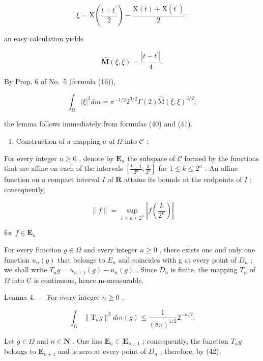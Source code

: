 \[
\xi = \mathrm{X} \left(\frac {t + t ^ {\prime}}{2}\right) - \frac {\mathrm{X} (t) + \mathrm{X} (t ^ {\prime})}{2};\tag{39}
\]

an easy calculation yields

\[
\widehat {\mathbf {M}} (\xi , \xi) = \frac {| t - t ^ {\prime} |}{4}.\tag{40}
\]

By Prop. 6 of No.~5 (formula (16)),

\[
\int_ {\Omega} | \xi | ^ {3} d m = \pi^ {- 1 / 2} 2 ^ {3 / 2} \Gamma (2) \widehat {\mathrm{M}} (\xi , \xi) ^ {3 / 2};\tag{41}
\]

the lemma follows immediately from formulas (40) and (41).

\begin{enumerate}
\def\labelenumi{\Alph{enumi})}
\setcounter{enumi}{1}
\tightlist
\item
  Construction of a mapping \(u\) of \(\Omega\) into \(\mathcal{C}\) :
\end{enumerate}

For every integer \(n \geqslant 0\) , denote by \(\mathbf{E}_n\) the subspace of \(\mathcal{C}\) formed by the functions that are affine on each of the intervals \(\left[\frac{k - 1}{2^n}, \frac{k}{2^n}\right]\) for \(1 \leqslant k \leqslant 2^n\) . An affine function on a compact interval \(I\) of \(\mathbf{R}\) attains its bounds at the endpoints of \(I\) ; consequently,

\[
\| f \| = \sup _ {1 \leqslant k \leqslant 2 ^ {n}} \left| f \left(\frac {k}{2 ^ {n}}\right) \right|\tag{42}
\]

for \(f\in \mathbf{E}_n\)

For every function \(g \in \Omega\) and every integer \(n \geqslant 0\) , there exists one and only one function \(u_{n}(g)\) that belongs to \(E_{n}\) and coincides with g at every point of \(D_{n}\) ; we shall write \(T_{n}g = u_{n+1}(g) - u_{n}(g)\) . Since \(D_{n}\) is finite, the mapping \(T_{n}\) of \(\Omega\) into C is continuous, hence m-measurable.

Lemma 4. --- For every integer \(n \geqslant 0\) ,

\[
\int_ {\Omega} \| \mathrm{T} _ {n} g \| ^ {3} d m (g) \leqslant \frac {1}{(8 \pi) ^ {1 / 2}} 2 ^ {- n / 2}.\tag{43}
\]

Let \(g \in \Omega\) and \(n \in \mathbf{N}\) . One has \(\mathbf{E}_n \subset \mathbf{E}_{n+1}\) ; consequently, the function \(T_n g\) belongs to \(\mathbf{E}_{n+1}\) and is zero at every point of \(D_n\) ; therefore, by (42),

